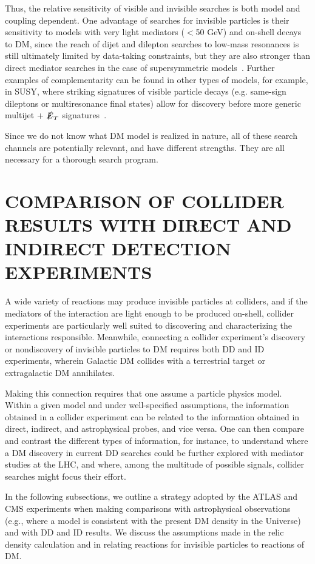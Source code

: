 \documentclass{ar-1col}
\newcommand{\IP}{invisible particle}
\newcommand{\MET}{\ensuremath{\slashed{E}_T}\xspace}
\begin{document}
{Thus, the relative sensitivity of visible and invisible searches
is both model and coupling dependent. One advantage of
searches for {\IP}s is their sensitivity to models
with very light mediators ($<$50 GeV) and on-shell decays to DM, since the
reach of dijet and dilepton searches to low-mass resonances is
still ultimately limited by data-taking constraints, 
but they are also stronger than direct mediator searches in the
case of supersymmetric models~\cite{Liew:2016oon}. 
Further examples of complementarity can be found in other types of models, 
for example, in SUSY, where striking signatures of visible particle decays (e.g. same-sign dileptons
or multiresonance final states) allow for discovery before more generic multijet + \MET signatures~\cite{Acharya:2009gb}. 

Since we do not know what DM model is realized in nature, 
all of these search channels are potentially relevant, 
and have different strengths. They are all necessary for 
a thorough search program. 

\section{COMPARISON OF COLLIDER RESULTS WITH DIRECT AND INDIRECT DETECTION EXPERIMENTS}\label{sec:04_Extrapolation}

A wide variety of reactions may produce {\IP}s at colliders, and
if the mediators of the interaction are light enough to be
produced on-shell, collider experiments are particularly well suited to
discovering and characterizing the interactions responsible.
Meanwhile, connecting a collider experiment's discovery or
nondiscovery of {\IP}s to DM requires both DD and
ID experiments, wherein Galactic DM
collides with a terrestrial target or extragalactic DM
annihilates.

Making this connection requires that one assume a particle
physics model. Within a given model and under well-specified
assumptions, the information obtained in a collider experiment can
be related to the information obtained in direct, indirect, and
astrophysical probes, and vice versa. One can then compare and
contrast the different types of information, for instance, to understand
where a DM discovery in current DD searches could be further
explored with mediator studies at the LHC, and where, among the
multitude of possible signals, collider searches might focus
their effort.

In the following subsections, we outline a strategy adopted by the ATLAS and
CMS experiments when making comparisons with astrophysical
observations (e.g., where a model is consistent with the present
DM density in the Universe) and with DD and ID results. We discuss the
assumptions made in the relic density calculation and in relating
reactions for {\IP}s to reactions of DM.

}
\end{document}
